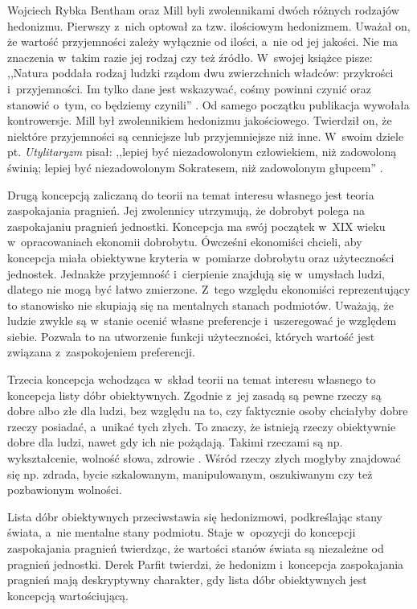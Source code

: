 \begin{artplenv}{Wojciech Rybka}
Bentham oraz Mill byli zwolennikami dwóch różnych rodzajów hedonizmu. Pierwszy z~nich optował za tzw. ilościowym
hedonizmem. Uważał on, że wartość przyjemności zależy wyłącznie od ilości, a~nie od jej jakości. Nie ma
znaczenia w~takim razie jej rodzaj czy też źródło. W~swojej książce pisze: ,,Natura poddała rodzaj ludzki rządom dwu zwierzchnich
władców: przykrości i~przyjemności. Im tylko dane jest wskazywać, cośmy powinni czynić oraz stanowić o~tym, co będziemy
czynili''
\parencite[s.~17]{bentham_wprowadzenie_1958}.
Od samego początku publikacja wywołała kontrowersje. Mill był
zwolennikiem hedonizmu jakościowego. Twierdził on, że niektóre przyjemności są cenniejsze lub przyjemniejsze niż inne.
W~swoim dziele pt. \textit{Utylitaryzm} pisał: ,,lepiej być niezadowolonym człowiekiem, niż zadowoloną świnią; lepiej
być niezadowolonym Sokratesem, niż zadowolonym głupcem''
\parencite[s.~18]{mill_utylitaryzm:_1959}.

Drugą koncepcją zaliczaną do teorii na temat interesu własnego jest teoria zaspokajania pragnień. Jej zwolennicy
utrzymują, że dobrobyt polega na zaspokajaniu pragnień jednostki. Koncepcja ma swój początek w~XIX
wieku w~opracowaniach ekonomii dobrobytu. Ówcześni ekonomiści chcieli, aby koncepcja miała obiektywne kryteria w~pomiarze
dobrobytu oraz użyteczności jednostek. Jednakże przyjemność i~cierpienie znajdują się w~umysłach ludzi, dlatego nie
mogą być łatwo zmierzone. Z~tego względu ekonomiści reprezentujący to stanowisko nie skupiają się na mentalnych stanach
podmiotów. Uważają, że ludzie zwykle są w~stanie ocenić własne preferencje i~uszeregować je względem siebie. Pozwala to
na utworzenie funkcji użyteczności, których wartość jest związana z~zaspokojeniem preferencji.

Trzecia koncepcja wchodząca w~skład teorii na temat interesu własnego to koncepcja listy dóbr obiektywnych.
Zgodnie z~jej zasadą są pewne rzeczy są dobre albo złe dla ludzi, bez względu na to, czy faktycznie osoby chciałyby dobre rzeczy
posiadać, a~unikać tych złych. To znaczy, że istnieją rzeczy obiektywnie dobre dla ludzi, nawet gdy ich nie pożądają.
Takimi rzeczami są np. wykształcenie, wolność słowa, zdrowie
\parencite{mill_utylitaryzm:_1959}.
Wśród rzeczy złych
mogłyby znajdować się np. zdrada, bycie szkalowanym, manipulowanym, oszukiwanym czy też pozbawionym wolności. 

Lista dóbr obiektywnych przeciwstawia się hedonizmowi, podkreślając stany świata, a~nie mentalne stany podmiotu.
Staje w~opozycji do koncepcji zaspokajania pragnień twierdząc, że wartości stanów świata są niezależne od pragnień jednostki.
Derek Parfit
\parencite*{parfit_racje_2012}
twierdzi, że hedonizm i~koncepcja zaspokajania pragnień mają deskryptywny
charakter, gdy lista dóbr obiektywnych jest koncepcją wartościującą.


\end{artplenv}
